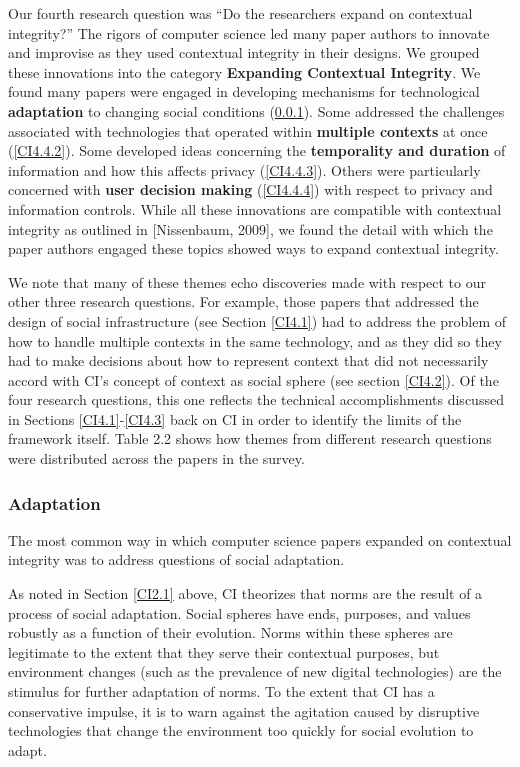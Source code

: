 \documentclass[../thesis.tex]{subfiles}
\begin{document}
Our fourth research question was ``Do the researchers
expand on contextual integrity?'' The rigors of
computer science led many paper authors to innovate and improvise as
they used contextual integrity in their designs. We grouped these
innovations into the category \textbf{Expanding Contextual Integrity}.
We found many papers were engaged in developing mechanisms for
technological \textbf{adaptation} to changing social conditions
(\ref{CI4.4.1}). Some addressed the challenges associated with technologies
that operated within \textbf{multiple contexts} at once (\ref{CI4.4.2}). Some
developed ideas concerning the \textbf{temporality and duration} of
information and how this affects privacy (\ref{CI4.4.3}). Others were
particularly concerned with \textbf{user decision making} (\ref{CI4.4.4}) with
respect to privacy and information controls. While all these
innovations are compatible with contextual integrity as outlined in
[Nissenbaum, 2009], we found the detail with which the paper authors
engaged these topics showed ways to expand contextual integrity.

We note that many of these themes echo discoveries made with respect to
our other three research questions. For example, those papers that
addressed the design of social infrastructure (see Section \ref{CI4.1}) had to
address the problem of how to handle multiple contexts in the same
technology, and as they did so they had to make decisions about how to
represent context that did not necessarily accord with
CI's concept of context as social sphere (see section
\ref{CI4.2}). Of the four research questions, this one reflects the technical
accomplishments discussed in Sections \ref{CI4.1}-\ref{CI4.3}
back on CI in order to
identify the limits of the framework itself. Table 2.2 shows how themes
from different research questions were distributed across the papers in
the survey.

\subsubsection{Adaptation}
\label{CI4.4.1}

The most common way in which computer science papers expanded on
contextual integrity was to address questions of social adaptation.

As noted in Section \ref{CI2.1} above, CI theorizes that norms are the result of
a process of social adaptation. Social spheres have ends, purposes, and
values robustly as a function of their evolution. Norms within these
spheres are legitimate to the extent that they serve their contextual
purposes, but environment changes (such as the prevalence of new
digital technologies) are the stimulus for further adaptation of norms.
To the extent that CI has a conservative impulse, it is to warn against
the agitation caused by disruptive technologies that change the
environment too quickly for social evolution to adapt.
\end{document}
